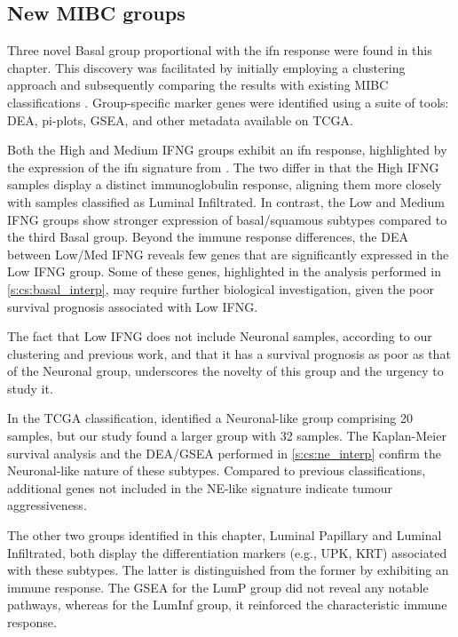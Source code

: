 \subsection*{New MIBC groups}

Three novel Basal group proportional with the \acrfull{ifn} response were found in this chapter. This discovery was facilitated by initially employing a  clustering approach and subsequently comparing the results with existing MIBC classifications \citet{Baker2022-bj,Marzouka2018-ge}. Group-specific marker genes were identified using a suite of tools: DEA, pi-plots, GSEA, and other metadata available on TCGA.

Both the High and Medium IFNG groups exhibit an \acrshort{ifn} response, highlighted by the expression of the \acrshort{ifn} signature from \citet{Baker2022-bj}. The two differ in that the High IFNG samples display a distinct immunoglobulin response, aligning them more closely with samples classified as Luminal Infiltrated. In contrast, the Low and Medium IFNG groups show stronger expression of basal/squamous subtypes compared to the third Basal group. Beyond the immune response differences, the DEA between Low/Med IFNG reveals few genes that are significantly expressed in the Low IFNG group. Some of these genes, highlighted in the analysis performed in \cref{s:cs:basal_interp}, may require further biological investigation, given the poor survival prognosis associated with Low IFNG.

The fact that Low IFNG does not include Neuronal samples, according to our clustering and previous work, and that it has a survival prognosis as poor as that of the Neuronal group, underscores the novelty of this group and the urgency to study it.

In the TCGA classification, \citet{Robertson2017-mg} identified a Neuronal-like group comprising 20 samples, but our study found a larger group with 32 samples. The Kaplan-Meier survival analysis and the DEA/GSEA performed in \cref{s:cs:ne_interp} confirm the Neuronal-like nature of these subtypes. Compared to previous classifications, additional genes not included in the NE-like signature indicate tumour aggressiveness.

The other two groups identified in this chapter, Luminal Papillary and Luminal Infiltrated, both display the differentiation markers (e.g., UPK, KRT) associated with these subtypes. The latter is distinguished from the former by exhibiting an immune response. The GSEA for the LumP group did not reveal any notable pathways, whereas for the LumInf group, it reinforced the characteristic immune response.


